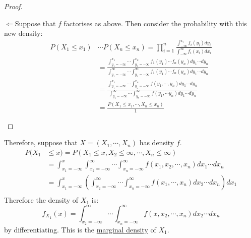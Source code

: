 \documentclass[../Main.tex]{subfiles}
\begin{document}
\begin{proof}
\begin{proofdirection}{$\Leftarrow$}{Suppose that $f$ factorises as above.}
        Then consider the probability with this new density:
        \begin{align*}
            P(X_1 \leq x_1)&\cdots P(X_n \leq x_n) = \prod_{i=1}^{n} \frac{\int_{-\infty}^{x_i} f_i(y_i) dy_i}{\int_{-\infty}^\infty f_i(x_i) dx_i} \\
            &= \frac{\int_{y_1 = -\infty}^{x_1} \cdots \int_{y_n = -\infty}^{x_n} f_1(y_1) \cdots f_n(y_n) dy_1 \cdots dy_n}{\int_{y_1 = -\infty}^{\infty} \cdots \int_{y_n = -\infty}^{\infty} f_1(y_1) \cdots f_n(y_n) dy_1 \cdots dy_n} \\
            &= \frac{\int_{y_1 = -\infty}^{x_1} \cdots \int_{y_n = -\infty}^{x_n} f(y_1, \cdots, y_n) dy_1 \cdots dy_n}{\int_{y_1 = -\infty}^{\infty} \cdots \int_{y_n = -\infty}^{\infty} f(y_1, \cdots y_n) dy_1 \cdots dy_n} \\
            &=\frac{P(X_1 \leq x_1, \cdots, X_n \leq x_n)}{1}
        \end{align*}
    \end{proofdirection}
\end{proof}
Therefore, suppose that $X = (X_1, \cdots, X_n)$ has density $f$.
\begin{align*}
    P(X_1 &\leq x) = P(X_1 \leq x, X_2 \leq \infty, \cdots, X_n \leq \infty) \\
    &= \int_{x_1 = -\infty}^x \int_{x_2 = -\infty}^\infty \cdots \int_{x_n = -\infty}^\infty f(x_1, x_2, \cdots, x_n) dx_1 \cdots dx_n \\
    &= \int_{x_1 = -\infty}^x \left(\int_{x_2 = -\infty}^\infty \cdots \int_{x_n = -\infty}^\infty f(x_1, \cdots, x_n) dx_2 \cdots dx_n\right)dx_1 \\
\end{align*}
Therefore the density of $X_1$ is:
\begin{equation*}
    f_{X_1}(x) = \int_{x_2 = -\infty}^\infty \cdots \int_{x_n = -\infty}^\infty f(x, x_2, \cdots, x_n) dx_2 \cdots dx_n
\end{equation*}
by differentiating. This is the \underline{marginal density} of $X_1$.
\end{document}
